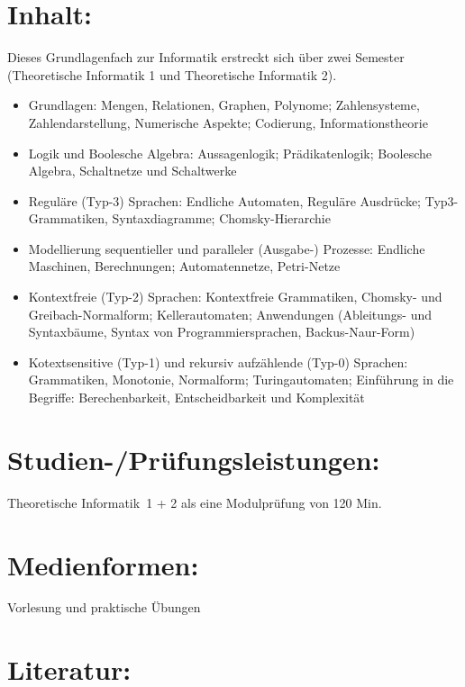 \section*{Inhalt:}\label{inhalt-28}

Dieses Grundlagenfach zur Informatik erstreckt sich über zwei Semester
(Theoretische Informatik 1 und Theoretische Informatik 2).

\begin{itemize}
\item
  Grundlagen: Mengen, Relationen, Graphen, Polynome; Zahlensysteme,
  Zahlendarstellung, Numerische Aspekte; Codierung, Informationstheorie
\item
  Logik und Boolesche Algebra: Aussagenlogik; Prädikatenlogik; Boolesche
  Algebra, Schaltnetze und Schaltwerke
\item
  Reguläre (Typ-3) Sprachen: Endliche Automaten, Reguläre Ausdrücke;
  Typ3-Grammatiken, Syntaxdiagramme; Chomsky-Hierarchie
\item
  Modellierung sequentieller und paralleler (Ausgabe-) Prozesse:
  Endliche Maschinen, Berechnungen; Automatennetze, Petri-Netze
\item
  Kontextfreie (Typ-2) Sprachen: Kontextfreie Grammatiken, Chomsky- und
  Greibach-Normalform; Kellerautomaten; Anwendungen (Ableitungs- und
  Syntaxbäume, Syntax von Programmiersprachen, Backus-Naur-Form)
\item
  Kotextsensitive (Typ-1) und rekursiv aufzählende (Typ-0) Sprachen:
  Grammatiken, Monotonie, Normalform; Turingautomaten; Einführung in die
  Begriffe: Berechenbarkeit, Entscheidbarkeit und Komplexität
\end{itemize}

\section*{Studien-/Prüfungsleistungen:}\label{studien-pruxfcfungsleistungen-23}

Theoretische Informatik~1 + 2 als eine Modulprüfung von 120 Min.

\section*{Medienformen:}\label{medienformen-17}

Vorlesung und praktische Übungen

\section*{Literatur:}\label{literatur-24}

